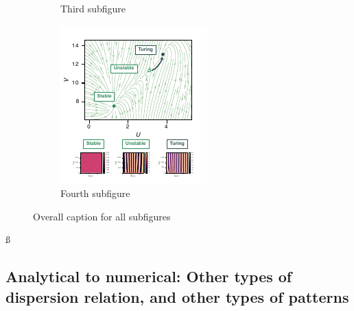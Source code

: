 \begin{figure}[H]
\begin{subfigure}{.5\linewidth}
            \caption{Third subfigure}
        \end{subfigure}%
        \begin{subfigure}{.5\linewidth}
            \centering
            \includegraphics[width=\linewidth]{chapters/Chapter 1/multistability1}
            \caption{Fourth subfigure}
        \end{subfigure}
        \caption{Overall caption for all subfigures}
\end{figure}



ß
%
%
%


\subsection{Analytical to numerical: Other types of dispersion relation, and other types of patterns}

